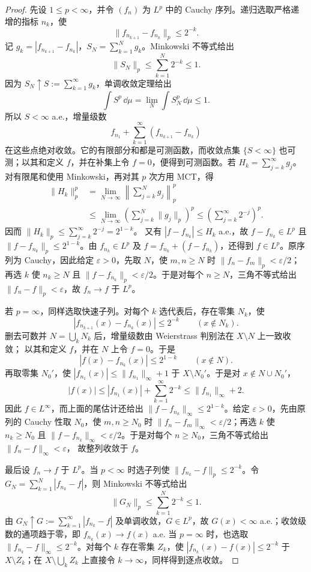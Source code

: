 \begin{proof}
先设 $1\le p<\infty$，并令 $(f_n)$ 为 $L^p$ 中的 Cauchy 序列。递归选取严格递增的指标
$n_k$，使
\[
  \|f_{n_{k+1}}-f_{n_k}\|_p\le2^{-k}.
\]
记 $g_k=|f_{n_{k+1}}-f_{n_k}|$，$S_N=\sum_{k=1}^Ng_k$。Minkowski 不等式给出
\[
  \|S_N\|_p\le\sum_{k=1}^N2^{-k}\le1.
\]
因为 $S_N\uparrow S:=\sum_{k=1}^\infty g_k$，单调收敛定理给出
\[
  \int S^p\,\dd\mu
  =\lim_N\int S_N^p\,\dd\mu\le1.
\]
所以 $S<\infty$ a.e.，增量级数
\[
 f_{n_1}+\sum_{k=1}^\infty(f_{n_{k+1}}-f_{n_k})
\]
在这些点绝对收敛。它的有限部分和都是可测函数，而收敛点集
$\{S<\infty\}$ 也可测；以其和定义 $f$，并在补集上令 $f=0$，便得到可测函数。若
$H_k=\sum_{j=k}^\infty g_j$。对有限尾和使用 Minkowski，再对其 $p$ 次方用 MCT，得
\[
 \begin{aligned}
 \|H_k\|_p^p
 &=\lim_{N\to\infty}
   \left\|\sum_{j=k}^Ng_j\right\|_p^p\\
 &\le\lim_{N\to\infty}
   \left(\sum_{j=k}^N\|g_j\|_p\right)^p
 \le\left(\sum_{j=k}^{\infty}2^{-j}\right)^p.
 \end{aligned}
\]
因而 $\|H_k\|_p\le\sum_{j=k}^\infty2^{-j}=2^{1-k}$。
又有 $|f-f_{n_k}|\le H_k$ a.e.，故 $f-f_{n_k}\in L^p$ 且
$\|f-f_{n_k}\|_p\le2^{1-k}$。由 $f_{n_k}\in L^p$ 及
$f=f_{n_k}+(f-f_{n_k})$，还得到 $f\in L^p$。原序列为 Cauchy，因此给定 $\varepsilon>0$，先取 $N$，使
$m,n\ge N$ 时 $\|f_n-f_m\|_p<\varepsilon/2$；再选 $k$ 使 $n_k\ge N$ 且
$\|f-f_{n_k}\|_p<\varepsilon/2$。于是对每个 $n\ge N$，三角不等式给出
$\|f_n-f\|_p<\varepsilon$，故 $f_n\to f$ 于 $L^p$。

若 $p=\infty$，同样选取快速子列。对每个 $k$ 选代表后，存在零集 $N_k$，使
\[
 |f_{n_{k+1}}(x)-f_{n_k}(x)|\le2^{-k}\qquad(x\notin N_k).
\]
删去可数并 $N=\bigcup_kN_k$ 后，增量级数由 Weierstrass 判别法在 $X\setminus N$ 上一致收敛；
以其和定义 $f$，并在 $N$ 上令 $f=0$。于是
\[
  |f(x)-f_{n_k}(x)|\le2^{1-k}\qquad(x\notin N).
\]
再取零集 $N_0'$，使
$|f_{n_1}(x)|\le\|f_{n_1}\|_\infty+1$ 于 $X\setminus N_0'$。于是对
$x\notin N\cup N_0'$，
\[
 |f(x)|\le |f_{n_1}(x)|+\sum_{k=1}^\infty2^{-k}
 \le\|f_{n_1}\|_\infty+2.
\]
因此 $f\in L^\infty$，而上面的尾估计还给出
$\|f-f_{n_k}\|_\infty\le2^{1-k}$。给定 $\varepsilon>0$，先由原列的 Cauchy 性取
$N_0$，使 $m,n\ge N_0$ 时 $\|f_n-f_m\|_\infty<\varepsilon/2$；再选 $k$ 使
$n_k\ge N_0$ 且 $\|f-f_{n_k}\|_\infty<\varepsilon/2$。于是对每个 $n\ge N_0$，三角不等式给出
$\|f_n-f\|_\infty<\varepsilon$，
故整列收敛于 $f$。

最后设 $f_n\to f$ 于 $L^p$。当 $p<\infty$ 时选子列使
$\|f_{n_k}-f\|_p\le2^{-k}$。令
$G_N=\sum_{k=1}^N|f_{n_k}-f|$，则 Minkowski 不等式给出
\[
 \|G_N\|_p\le\sum_{k=1}^N2^{-k}\le1.
\]
由 $G_N\uparrow G:=\sum_{k=1}^\infty|f_{n_k}-f|$ 及单调收敛，$G\in L^p$，故
$G(x)<\infty$ a.e.；收敛级数的通项趋于零，即 $f_{n_k}(x)\to f(x)$ a.e.
当 $p=\infty$ 时，也选取 $\|f_{n_k}-f\|_\infty\le2^{-k}$。对每个 $k$ 存在零集 $Z_k$，使
$|f_{n_k}(x)-f(x)|\le2^{-k}$ 于 $X\setminus Z_k$；在
$X\setminus\bigcup_kZ_k$ 上直接令 $k\to\infty$，同样得到逐点收敛。
\end{proof}

